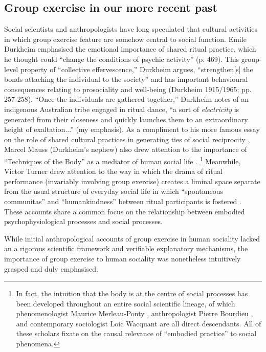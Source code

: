 \begin{CJK}{UTF8}{gbsn}
\subsection{Group exercise in our more recent past}
Social scientists and anthropologists \citep[see, for example][]{Durkheim1965} have long speculated that cultural activities in which group exercise feature are somehow central to social function.  Emile Durkheim emphasised the emotional importance of shared ritual practice, which he thought could ``change the conditions of psychic activity'' (p. 469).  This group-level property of ``collective effervescence,'' Durkheim argues, ``strengthen[s] the bonds attaching the individual to the society'' and has important behavioural consequences relating to prosociality and well-being (Durkheim 1915/1965; pp. 257-258). ``Once the individuals are gathered together,'' Durkheim notes of an indigenous Australian tribe engaged in ritual dance, ``a sort of \textit{electricity} is generated from their closeness and quickly launches them to an extraordinary height of exaltation...'' (my emphasis).  As a compliment to his more famous essay on the role of shared cultural practices in generating ties of social reciprocity \citep[i.e., ``The Gift''][]{Mauss2000}, Marcel Mauss (Durkheim's nephew) also drew attention to the importance of ``Techniques of the Body'' as a mediator of human social life \citep{Mauss1935}.
    \footnote{In fact, the intuition that the body is at the centre of social processes has been developed throughout an entire social scientific lineage, of which phenomenologist Maurice Merleau-Ponty \citep{Merleau-Ponty1956}, anthropologist Pierre Bourdieu \citep{Bourdieu1990}, and contemporary sociologist Loic Wacquant \citep{Wacquant2004} are all direct descendants.  All of these scholars fixate on the causal relevance of ``embodied practice'' to social phenomena.}
Meanwhile, Victor Turner drew attention to the way in which the drama of ritual performance (invariably involving group exercise) creates a liminal space separate from the usual structure of everyday social life in which ``spontaneous communitas'' and ``humankindness'' between ritual participants is fostered \citep{Turner1974}.  These accounts share a common focus on the relationship between embodied psychophysiological processes and social processes.

While initial anthropological accounts of group exercise in human sociality lacked an a rigorous scientific framework and verifiable explanatory mechanisms, the importance of group exercise to human sociality was nonetheless intuitively grasped and duly emphasised.


\end{CJK}
